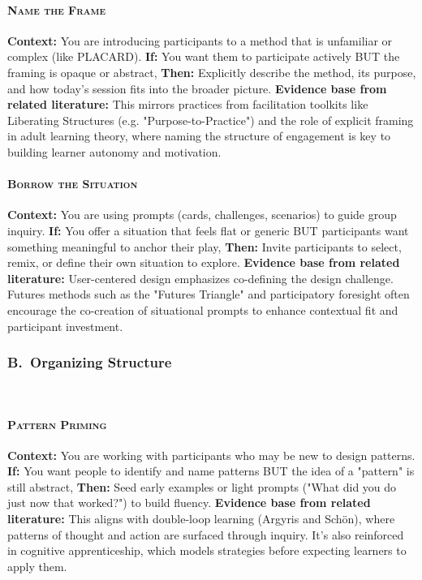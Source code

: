 \documentclass[acmlarge,timestamp]{acmart}
\begin{document}
{\paragraph*{{\scshape Name the Frame}}

\noindent\textbf{Context:} You are introducing participants to a method that is unfamiliar or complex (like PLACARD).
\textbf{If:} You want them to participate actively BUT the framing is opaque or abstract,
\textbf{Then:} Explicitly describe the method, its purpose, and how today’s session fits into the broader picture.
\textbf{Evidence base from related literature:} This mirrors practices from facilitation toolkits like Liberating Structures (e.g. "Purpose-to-Practice") and the role of explicit framing in adult learning theory, where naming the structure of engagement is key to building learner autonomy and motivation.

\paragraph*{{\scshape Borrow the Situation}}

\noindent \textbf{Context:} You are using prompts (cards, challenges, scenarios) to guide group inquiry.
\textbf{If:} You offer a situation that feels flat or generic BUT participants want something meaningful to anchor their play,
\textbf{Then:} Invite participants to select, remix, or define their own situation to explore.
\textbf{Evidence base from related literature:} User-centered design emphasizes co-defining the design challenge. Futures methods such as the "Futures Triangle" and participatory foresight often encourage the co-creation of situational prompts to enhance contextual fit and participant investment.

\subsubsection*{B.~Organizing Structure}
~\newline

\paragraph*{{\scshape Pattern Priming}}

\noindent \textbf{Context:} You are working with participants who may be new to design patterns.
\textbf{If:} You want people to identify and name patterns BUT the idea of a "pattern" is still abstract,
\textbf{Then:} Seed early examples or light prompts ("What did you do just now that worked?") to build fluency.
\textbf{Evidence base from related literature:} This aligns with double-loop learning (Argyris and Schön), where patterns of thought and action are surfaced through inquiry. It's also reinforced in cognitive apprenticeship, which models strategies before expecting learners to apply them.

}
\end{document}
